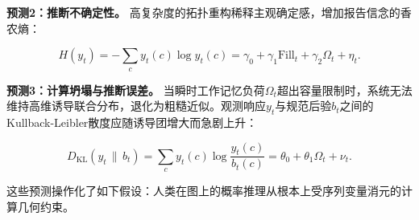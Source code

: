 \textbf{预测2：推断不确定性。} 高复杂度的拓扑重构稀释主观确定感，增加报告信念的香农熵：

\begin{equation*}
H(y_t)=-\sum_c y_t(c)\log y_t(c)=\gamma_0+\gamma_1\text{Fill}_t+\gamma_2\Omega_t+\eta_t.
\end{equation*}

\textbf{预测3：计算坍塌与推断误差。} 当瞬时工作记忆负荷$\Omega_t$超出容量限制时，系统无法维持高维诱导联合分布，退化为粗糙近似。观测响应$y_t$与规范后验$b_t$之间的Kullback-Leibler散度应随诱导团增大而急剧上升：

\begin{equation*}
D_{\mathrm{KL}}(y_t\,\|\,b_t)=\sum_c y_t(c)\log\frac{y_t(c)}{b_t(c)}=\theta_0+\theta_1\Omega_t+\nu_t.
\end{equation*}

这些预测操作化了如下假设：人类在图上的概率推理从根本上受序列变量消元的计算几何约束。






